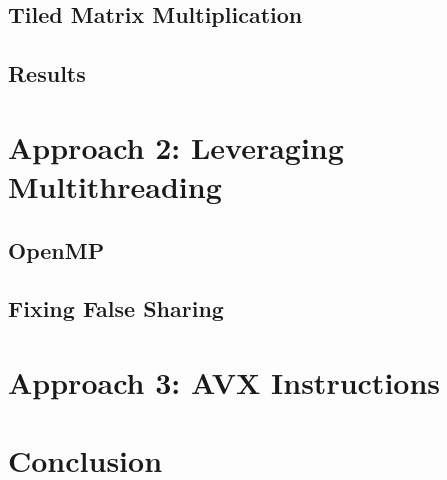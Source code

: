 \documentclass{article}
\begin{document}
\subsection{Tiled Matrix Multiplication}

\subsection{Results}

\section{Approach 2: Leveraging Multithreading}

\subsection{OpenMP}

\subsection{Fixing False Sharing}

\section{Approach 3: AVX Instructions}

\section{Conclusion}
\end{document}
